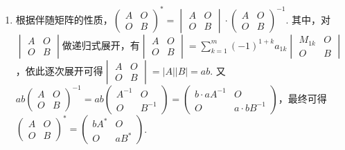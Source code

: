 \begin{enumerate}
\item 根据伴随矩阵的性质，$\begin{pmatrix}
            A & O \\ O & B
        \end{pmatrix}^* = \begin{vmatrix}
            A & O \\ O & B
        \end{vmatrix} \cdot \begin{pmatrix}
            A & O \\ O & B
        \end{pmatrix}^{-1}$. 其中，对$\begin{vmatrix}
            A & O \\ O & B
        \end{vmatrix}$做递归式展开，有$\begin{vmatrix}
            A & O \\ O & B
        \end{vmatrix}=\displaystyle\sum_{k=1}^{m}(-1)^{1+k}a_{1k}\begin{vmatrix}
            M_{1k} & O \\ O & B
        \end{vmatrix}$，依此逐次展开可得$\begin{vmatrix}
            A & O \\ O & B
        \end{vmatrix}=|A||B|=ab$. 又$ab\begin{pmatrix}
            A & O \\ O & B
        \end{pmatrix}^{-1}=ab\begin{pmatrix}
            A^{-1} & O \\ O & B^{-1}
        \end{pmatrix}=\begin{pmatrix}
            b\cdot aA^{-1} & O \\ O & a\cdot bB^{-1}
        \end{pmatrix}$，最终可得$\begin{pmatrix}
            A & O \\ O & B
        \end{pmatrix}^* = \begin{pmatrix}
            bA^* & O \\ O & aB^*
        \end{pmatrix}$.


\end{enumerate}
